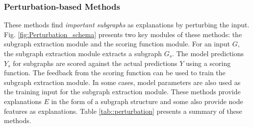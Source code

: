 \begin{table}[tb]
  \centering
  \caption{Key highlights of \textit{surrogate methods} }
  \label{tab::surrogate}%
\end{table}%













 \subsubsection{Perturbation-based Methods} 
 \label{sec:sourav_:perturbation}
 These methods find \textit{important subgraphs} as explanations by perturbing the input. Fig. \ref{fig:Perturbation_schema} presents two key modules of these methods: the subgraph extraction module and the scoring function module. For an input \(G\), the subgraph extraction module extracts a subgraph \(G_s\). The model predictions \(Y_s\) for subgraphs are scored against the actual predictions \(Y\) using a scoring function. The feedback from the scoring function can be used to train the subgraph extraction module. In some cases, model parameters are also used as the training input for the subgraph extraction module. These methods provide explanations \(E\) in the form of a subgraph structure and some also provide node features as explanations. Table \ref{tab::perturbation} presents a summary of these methods.

